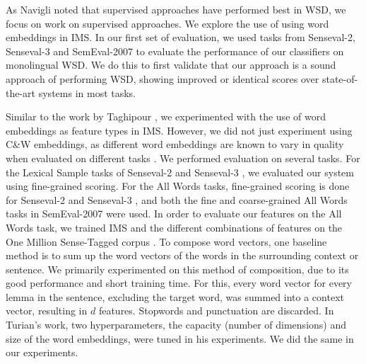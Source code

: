 \documentclass[11pt]{article}
\begin{document}
As Navigli  noted that supervised approaches have performed best in WSD, we focus on work on supervised approaches. 
We explore the use of using word embeddings in IMS. 
In our first set of evaluation, we used tasks from Senseval-2, Senseval-3 and SemEval-2007 to evaluate the performance of our classifiers on monolingual WSD. We do this to first validate that our approach is a sound approach of performing WSD, showing improved or identical scores over state-of-the-art systems in most tasks. 

Similar to the work by Taghipour , we experimented with the use of word embeddings as feature types in IMS. However, we did not just experiment using C\&W embeddings, as different word embeddings are known to vary in quality when evaluated on different tasks \cite{schnabel2015evaluation}. We performed evaluation on several tasks. For the Lexical Sample tasks of Senseval-2 \cite{senseval2-LS-kilgarriff2001} and Senseval-3 \cite{senseval3-LS-mihalcea2004}, we evaluated our system using fine-grained scoring. For the All Words tasks, fine-grained scoring is done for Senseval-2 \cite{senseval2-AW-palmer2001} and Senseval-3 \cite{senseval3-AW-snyder2004}, and both the fine \cite{semeval2007-fine-pradhan2007} and coarse-grained \cite{semeval2007-coarse-navigli2007} All Words tasks in SemEval-2007 were used. In order to evaluate our features on the All Words task, we trained IMS and the different combinations of features on the One Million Sense-Tagged corpus \cite{taghipour2015one}.
To compose word vectors, one baseline method is to sum up the word vectors of the words in the surrounding context or sentence. We primarily experimented on this method of composition, due to its good performance and short training time. For this, every word vector for every lemma in the sentence, excluding the target word, was summed into a context vector, resulting in $d$ features. Stopwords and punctuation are discarded. In Turian's  work, two hyperparameters, the capacity (number of dimensions) and size of the word embeddings, were tuned in his experiments. We did the same in our experiments.
\end{document}
